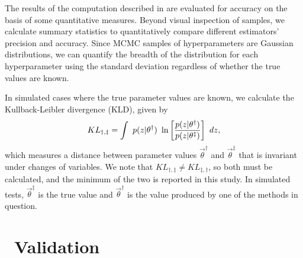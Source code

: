 The results of the computation described in  are evaluated for accuracy on the basis of some quantitative measures.  
Beyond visual inspection of samples, we calculate summary statistics to quantitatively compare different estimators' precision and accuracy.  
Since MCMC samples of hyperparameters are Gaussian distributions, we can quantify the breadth of the distribution for each hyperparameter using the standard deviation regardless of whether the true values are known.  

In simulated cases where the true parameter values are known, we calculate the Kullback-Leibler divergence (KLD), given by 
\begin{equation}
\eqlabel{eq:kl}
KL_{\dagger,\ddagger} = \int\ p(z|\theta^{\dagger})\ \ln\left[\frac{p(z|\theta^{\dagger})}{p(z|\theta^{\ddagger})}\right]\ dz,
\end{equation}
which measures a distance between parameter values $\vec{\theta}^{\dagger}$ and $\vec{\theta}^{\ddagger}$ that is invariant under changes of variables.  
We note that $KL_{\dagger,\ddagger}\neq KL_{\ddagger,\dagger}$, so both must be calculated, and the minimum of the two is reported in this study.  
In simulated tests, $\vec{\theta}^{\ddagger}$ is the true value and $\vec{\theta}^{\dagger}$ is the value produced by one of the methods in question.  

\section{\chippr\ Validation}


